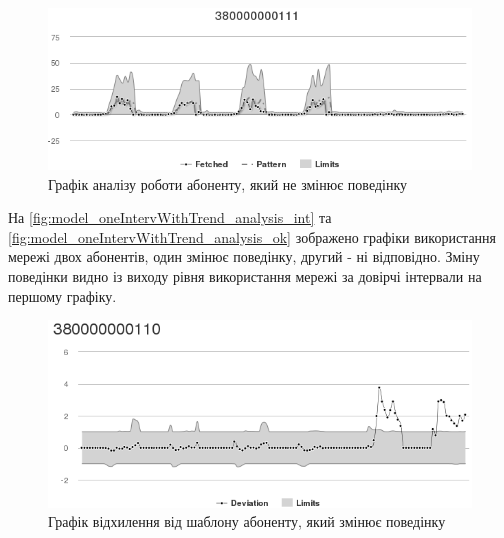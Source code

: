 \begin{figure}[h!]
        \begin{center}
            \includegraphics[scale=0.55]{resources/oneIntervWithTrend/analysis-ok.png}
        \end{center}
        \caption{Графік аналізу роботи абоненту, який не змінює поведінку}
        \label{fig:model_oneIntervWithTrend_analysis_ok}
\end{figure}
На \autoref{fig:model_oneIntervWithTrend_analysis_int} та \autoref{fig:model_oneIntervWithTrend_analysis_ok} зображено графіки використання мережі двох абонентів, один змінює поведінку, другий - ні відповідно. Зміну поведінки видно із виходу рівня використання мережі за довірчі інтервали на першому графіку.

\begin{figure}[h!]
        \begin{center}
            \includegraphics[scale=0.55]{resources/oneIntervWithTrend/dev-int.png}
        \end{center}
        \caption{Графік відхилення від шаблону абоненту, який змінює поведінку}
        \label{fig:model_oneIntervWithTrend_dev_int}
\end{figure}

